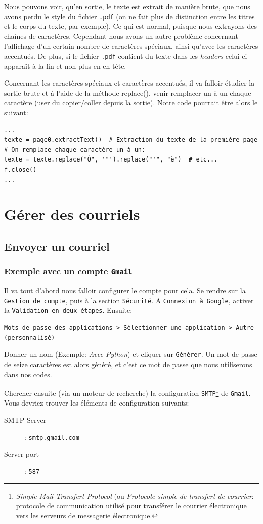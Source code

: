 \documentclass[a4paper,12pt]{book}
\begin{document}
Nous pouvons voir, qu'en sortie, le texte est extrait de manière brute, que nous avons perdu le style du fichier \texttt{.pdf} (on ne fait plus de distinction entre les titres et le corps du texte, par exemple). Ce qui est normal, puisque nous extrayons des chaînes de caractères.  Cependant nous avons un autre problème concernant l'affichage d'un certain nombre de caractères spéciaux, ainsi qu'avec les caractères accentués. De plus, si le fichier \texttt{.pdf} contient du texte dans les \textit{headers} celui-ci apparaît à la fin et non-plus en en-tête.
\medskip

Concernant les caractères spéciaux et caractères accentués, il va falloir étudier la sortie brute et à l'aide de la méthode replace(), venir remplacer un à un chaque caractère (user du copier/coller depuis la sortie). Notre code pourrait être alors le suivant:
\begin{lstlisting}
...
texte = page0.extractText()  # Extraction du texte de la première page
# On remplace chaque caractère un à un:
texte = texte.replace("Ò", '"').replace("'", "è")  # etc...
f.close()
...
\end{lstlisting}
\medskip

\chapter{Gérer des courriels}
\section{Envoyer un courriel}
\subsection*{Exemple avec un compte \texttt{Gmail}}
Il va tout d'abord nous falloir configurer le compte pour cela. Se rendre sur la \texttt{Gestion de compte}, puis à la section \texttt{Sécurité}. A \texttt{Connexion à Google}, activer la \texttt{Validation en deux étapes}. Ensuite: 
\begin{verbatim}
Mots de passe des applications > Sélectionner une application > Autre (personnalisé)
\end{verbatim}
\medskip

Donner un nom (Exemple: \og \textit{Avec Python}\fg{}) et cliquer sur \texttt{Générer}. Un mot de passe de seize caractères est alors généré, et c'est ce mot de passe que nous utiliserons dans nos codes.
\medskip

Chercher ensuite (via un moteur de recherche) la configuration \texttt{SMTP}\footnote{\textit{Simple Mail Transfert Protocol} (ou \textit{Protocole simple de transfert de courrier}: protocole de communication utilisé pour transférer le courrier électronique vers les serveurs de messagerie électronique.} de \texttt{Gmail}. Vous devriez trouver les éléments de configuration suivants:
\begin{description}
	\item[SMTP Server]: \texttt{smtp.gmail.com}
	\item[Server port]: \texttt{587}
\end{description}
\medskip
\end{document}
